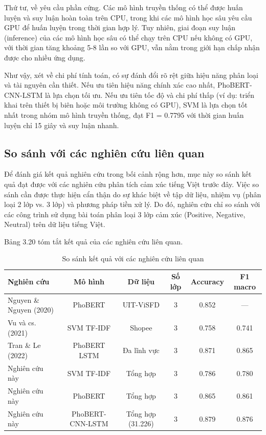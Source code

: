 \documentclass[14pt, a4paper]{report}
\begin{document}
Thứ tư, về yêu cầu phần cứng. Các mô hình truyền thống có thể được huấn luyện và suy luận hoàn toàn trên CPU, trong khi các mô hình học sâu yêu cầu GPU để huấn luyện trong thời gian hợp lý. Tuy nhiên, giai đoạn suy luận (inference) của các mô hình học sâu có thể chạy trên CPU nếu không có GPU, với thời gian tăng khoảng 5-8 lần so với GPU, vẫn nằm trong giới hạn chấp nhận được cho nhiều ứng dụng.


Như vậy, xét về chi phí tính toán, có sự đánh đổi rõ rệt giữa hiệu năng phân loại và tài nguyên cần thiết. Nếu ưu tiên hiệu năng chính xác cao nhất, PhoBERT-CNN-LSTM là lựa chọn tối ưu. Nếu ưu tiên tốc độ và chi phí thấp (ví dụ: triển khai trên thiết bị biên hoặc môi trường không có GPU), SVM là lựa chọn tốt nhất trong nhóm mô hình truyền thống, đạt F1 = 0.7795 với thời gian huấn luyện chỉ 15 giây và suy luận nhanh.


\subsection{So sánh với các nghiên cứu liên quan}


Để đánh giá kết quả nghiên cứu trong bối cảnh rộng hơn, mục này so sánh kết quả đạt được với các nghiên cứu phân tích cảm xúc tiếng Việt trước đây. Việc so sánh cần được thực hiện cẩn thận do sự khác biệt về tập dữ liệu, nhiệm vụ (phân loại 2 lớp vs. 3 lớp) và phương pháp tiền xử lý. Do đó, nghiên cứu chỉ so sánh với các công trình sử dụng bài toán phân loại 3 lớp cảm xúc (Positive, Negative, Neutral) trên dữ liệu tiếng Việt.


Bảng 3.20 tóm tắt kết quả của các nghiên cứu liên quan.


\begin{table}[h]
\centering
\caption{So sánh kết quả với các nghiên cứu liên quan}
\begin{tabular}{|l|c|c|c|c|c|}
\hline
\textbf{Nghiên cứu} & \textbf{Mô hình} & \textbf{Dữ liệu} & \textbf{Số lớp} & \textbf{Accuracy} & \textbf{F1 macro} \\
\hline
Nguyen \& Nguyen (2020) & PhoBERT & UIT-ViSFD & 3 & 0.852 & — \\
\hline
Vu và cs. (2021) & SVM \+ TF-IDF & Shopee & 3 & 0.758 & 0.741 \\
\hline
Tran \& Le (2022) & PhoBERT \+ LSTM & Đa lĩnh vực & 3 & 0.871 & 0.865 \\
\hline
Nghiên cứu này & SVM \+ TF-IDF & Tổng hợp & 3 & 0.786 & 0.780 \\
\hline
Nghiên cứu này & PhoBERT & Tổng hợp & 3 & 0.865 & 0.861 \\
\hline
Nghiên cứu này & PhoBERT-CNN-LSTM & Tổng hợp (31.226) & 3 & 0.879 & 0.876 \\
\hline
\end{tabular}
\end{table}
\end{document}
